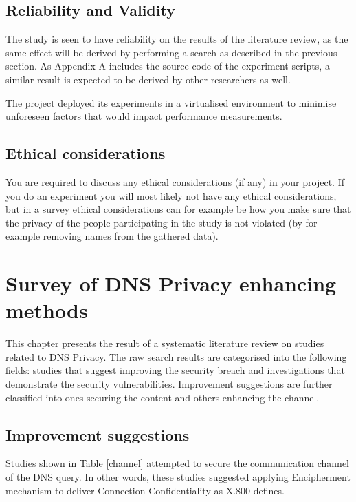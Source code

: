 \documentclass[a4paper,12pt]{article}
\begin{document}
\subsection{Reliability and Validity}
The study is seen to have reliability on the results of the literature review, as the same effect will be derived by performing a search as described in the previous section. As Appendix A includes the source code of the experiment scripts, a similar result is expected to be derived by other researchers as well. 

The project deployed its experiments in a virtualised environment to minimise unforeseen factors that would impact performance measurements.

\subsection{Ethical considerations}
You are required to discuss any ethical considerations (if any) in your project. If you do an experiment you will most likely not have any ethical considerations, but in a survey ethical considerations can for example be how you make sure that the privacy of the people participating in the study is not violated (by for example removing names from the gathered data). 

\newpage
\section{Survey of DNS Privacy enhancing methods}
This chapter presents the result of a systematic literature review on studies related to DNS Privacy. The raw search results are categorised into the following fields: studies that suggest improving the security breach and investigations that demonstrate the security vulnerabilities. Improvement suggestions are further classified into ones securing the content and others enhancing the channel.
\subsection{Improvement suggestions}
Studies shown in Table \ref{channel} attempted to secure the communication channel of the DNS query. In other words, these studies suggested applying Encipherment mechanism to deliver Connection Confidentiality as X.800 defines.
\end{document}
